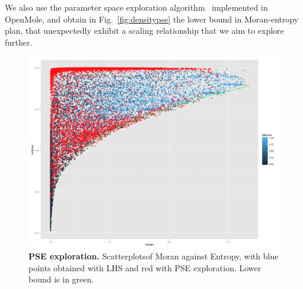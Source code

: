 \documentclass[10pt,letterpaper,draft]{article}
\begin{document}
We also use the parameter space exploration algorithm~\cite{10.1371/journal.pone.0138212} implemented in OpenMole, and obtain in Fig.~\ref{fig:densitypse} the lower bound in Moran-entropy plan, that unexpectedly exhibit a scaling relationship that we aim to explore further.

\begin{figure}
\includegraphics[width=\textwidth]{figures/Fig6.png}
\caption{\textbf{PSE exploration.} Scatterplotsof Moran against Entropy, with blue points obtained with LHS and red with PSE exploration. Lower bound is in green.}
\label{fig:fig5}
\end{figure}








\end{document}
